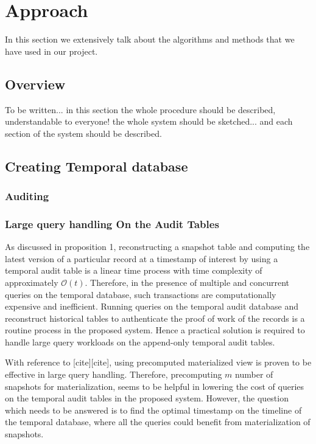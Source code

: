 \chapter{Approach}
\label{chap:approach}
In this section we extensively talk about the algorithms and methods that we have used in our project.

\section{Overview}
To be written... in this section the whole procedure should be described, understandable to everyone! the whole system should be sketched... and each section of the system should be described.

\section{Creating Temporal database}

\subsection{Auditing}
\subsection{Large query handling On the Audit Tables}
As discussed in proposition 1, reconstructing a snapshot table and computing the latest version of a particular record at a timestamp of interest by using a temporal audit table is a linear time process with time complexity of approximately $\mathcal{O}(t)$. Therefore, in the presence of multiple and concurrent queries on the temporal database, such transactions are computationally expensive and inefficient. Running queries on the temporal audit database and reconstruct historical tables to authenticate the proof of work of the records is a routine process in the proposed system. Hence a practical solution is required to handle large query workloads on the append-only temporal audit tables.

With reference to [cite][cite], using precomputed materialized view is proven to be effective in large query handling. Therefore, precomputing $m$ number of snapshots for materialization, seems to be helpful in lowering the cost of queries on the temporal audit tables in the proposed system. However, the question which needs to be answered is to find the optimal timestamp on the timeline of the temporal database, where all the queries could benefit from materialization of snapshots. 

